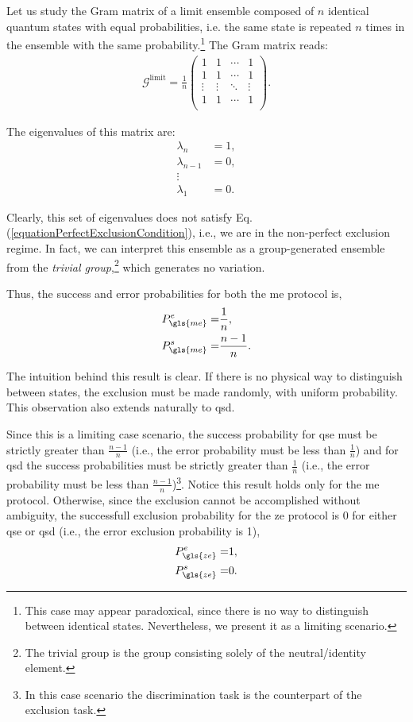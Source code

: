 \documentclass[12pt,letterpaper]{article}
\begin{document}
\hspace{20pt}Let us study the Gram matrix of a limit ensemble composed of $n$ identical quantum states with equal probabilities, i.e. the same state is repeated $n$ times in the ensemble with the same probability.\footnote{This case may appear paradoxical, since there is no way to distinguish between identical states. Nevertheless, we present it as a limiting scenario.} The Gram matrix reads:
\begin{align*}
	\mathcal{G}^{\text{limit}} = \frac{1}{n}\begin{pmatrix}
 1 & 1 & \cdots & 1 \\
 1 & 1 & \cdots & 1 \\
 \vdots & \vdots & \ddots & \vdots \\
 1 & 1 & \cdots & 1 \\
\end{pmatrix}.
\end{align*}

The eigenvalues of this matrix are:
\begin{align*}
	\lambda_n &= 1, \\
	\lambda_{n-1} &= 0, \\
	\vdots \\
	\lambda_1 &= 0.
\end{align*}

Clearly, this set of eigenvalues does not satisfy Eq. (\ref{equationPerfectExclusionCondition}), i.e., we are in the non-perfect exclusion regime. In fact, we can interpret this ensemble as a group-generated ensemble from the \emph{trivial group},\footnote{The trivial group is the group consisting solely of the neutral/identity element.} which generates no variation.

Thus, the success and error probabilities for both the \gls{me} protocol is,
\begin{align*}
	P_{\gls{me}}^e =& \frac{1}{n},\\
	P_{\gls{me}}^s =& \frac{n-1}{n}.
\end{align*}

The intuition behind this result is clear. If there is no physical way to distinguish between states, the exclusion must be made randomly, with uniform probability. This observation also extends naturally to \gls{qsd}.

Since this is a limiting case scenario, the success probability for \gls{qse} must be strictly greater than $\frac{n-1}{n}$ (i.e., the error probability must be less than $\frac{1}{n}$) and for \gls{qsd} the success probabilities must be strictly greater than $\frac{1}{n}$ (i.e., the error probability must be less than $\frac{n-1}{n}$)\footnote{In this case scenario the discrimination task is the counterpart of the exclusion task.}. Notice this result holds only for the \gls{me} protocol. Otherwise, since the exclusion cannot be accomplished without ambiguity, the successfull exclusion probability for the \gls{ze} protocol is 0 for either \gls{qse} or \gls{qsd} (i.e., the error exclusion probability is 1), 
\begin{align*}
	P_{\gls{ze}}^e =& 1,\\
	P_{\gls{ze}}^s =& 0.
\end{align*}
\end{document}
